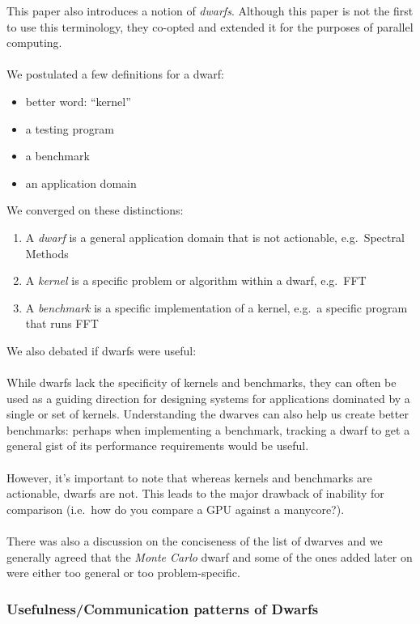 This paper also introduces a notion of \textit{dwarfs}.
Although this paper is not the first to use this terminology, they co-opted and extended it for the purposes of parallel computing.
\\ \\
We postulated a few definitions for a dwarf:
\begin{itemize}
    \item better word: ``kernel''
    \item a testing program
    \item a benchmark
    \item an application domain
\end{itemize}
We converged on these distinctions:
\begin{enumerate}
    \item A \textit{dwarf} is a general application domain that is not actionable, e.g.\ Spectral Methods
    \item A \textit{kernel} is a specific problem or algorithm within a dwarf, e.g.\ FFT
    \item A \textit{benchmark} is a specific implementation of a kernel, e.g.\ a specific program that runs FFT
\end{enumerate}
We also debated if dwarfs were useful:
\\ \\
While dwarfs lack the specificity of kernels and benchmarks, they can often be used as a guiding direction for designing systems for applications dominated by a single or set of kernels.
Understanding the dwarves can also help us create better benchmarks: perhaps when implementing a benchmark, tracking a dwarf to get a general gist of its performance requirements would be useful.
\\ \\
However, it's important to note that whereas kernels and benchmarks are actionable, dwarfs are not.
This leads to the major drawback of inability for comparison (i.e.\ how do you compare a GPU against a manycore?).
\\ \\
There was also a discussion on the conciseness of the list of dwarves and we generally agreed that the \textit{Monte Carlo} dwarf and some of the ones added later on were either too general or too problem-specific.

\subsubsection{Usefulness/Communication patterns of Dwarfs}

